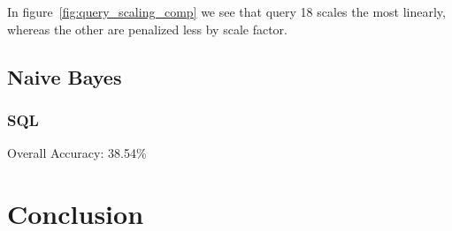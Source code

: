 \documentclass{article}
\begin{document}
In figure~\ref{fig:query_scaling_comp} we see that query 18 scales the most linearly, whereas the other are penalized less by scale factor. 

\FloatBarrier

\subsection{Naive Bayes}

\subsubsection{SQL}
Overall Accuracy: 38.54\%

\section{Conclusion}

\newpage


\end{document}
